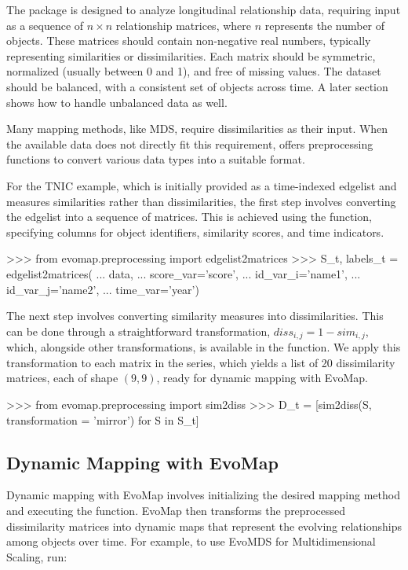 \documentclass[article]{jss}
\begin{document}
The  package is designed to analyze longitudinal relationship data, requiring input as 
a sequence of $n \times n$ relationship matrices, where $n$ represents the number of objects. 
These matrices should contain non-negative real numbers, typically representing similarities or dissimilarities. 
Each matrix should be symmetric, normalized (usually between 0 and 1), and free of missing values. 
The dataset should be balanced, with a consistent set of objects across time. 
A later section shows how to handle unbalanced data as well.

Many mapping methods, like MDS, require dissimilarities as their input. When the available data 
does not directly fit this requirement,  offers preprocessing functions to convert various 
data types into a suitable format. 

For the TNIC example, which is initially provided as a time-indexed edgelist and measures 
similarities rather than dissimilarities, the first step involves converting the edgelist 
into a sequence of matrices. This is achieved using the  function,
specifying columns for object identifiers, similarity scores, and time indicators. 

\begin{Code}
>>> from evomap.preprocessing import edgelist2matrices
>>> S_t, labels_t = edgelist2matrices(
...     data,
...     score_var='score',
...     id_var_i='name1',
...     id_var_j='name2',
...     time_var='year')  
\end{Code}

The next step involves converting similarity measures into dissimilarities. 
This can be done through a straightforward transformation, $diss_{i,j} = 1 - sim_{i,j}$, which, alongside 
other transformations, is available in the  function. 
We apply this transformation to each matrix in the series, which yields a list of 20 dissimilarity matrices, 
each of shape $(9,9)$, ready for dynamic mapping with EvoMap.

\begin{Code}
>>> from evomap.preprocessing import sim2diss
>>> D_t = [sim2diss(S, transformation = 'mirror') for S in S_t]
\end{Code}
  
\subsection{Dynamic Mapping with EvoMap}

Dynamic mapping with EvoMap involves initializing the desired mapping method and executing the  
function. EvoMap then transforms the preprocessed dissimilarity matrices into dynamic maps that represent the evolving 
relationships among objects over time. For example, to use EvoMDS for Multidimensional Scaling, run:
\end{document}
